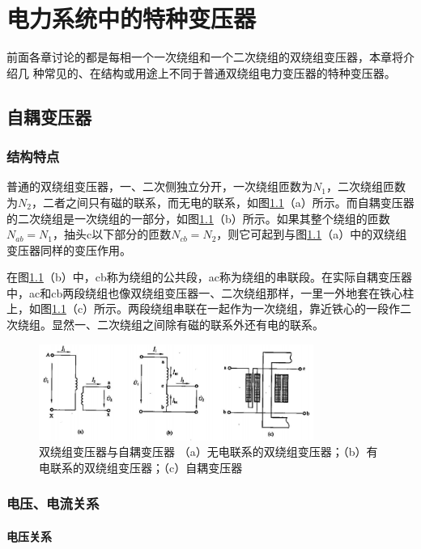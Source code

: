 \documentclass{book}
\begin{document}
\chapter{电力系统中的特种变压器}

前面各章讨论的都是每相一个一次绕组和一个二次绕组的双绕组变压器，本章将介绍几 种常见的、在结构或用途上不同于普通双绕组电力变压器的特种变压器。

\section{自耦变压器}

\subsection{结构特点}

普通的双绕组变压器，一、二次侧独立分开，一次绕组匝数为${{N}_{1}}$，二次绕组匝数为${{N}_{2}}$，二者之间只有磁的联系，而无电的联系，如图\ref{fig_5-1}（a）所示。而自耦变压器的二次绕组是一次绕组的一部分，如图\ref{fig_5-1}（b）所示。如果其整个绕组的匝数${{N}_{ab}}={{N}_{1}}$，抽头c以下部分的匝数${{N}_{cb}}={{N}_{2}}$，则它可起到与图\ref{fig_5-1}（a）中的双绕组变压器同样的变压作用。

在图\ref{fig_5-1}（b）中，cb称为绕组的公共段，ac称为绕组的串联段。在实际自耦变压器中，ac和cb两段绕组也像双绕组变压器一、二次绕组那样，一里一外地套在铁心柱上，如图\ref{fig_5-1}（c）所示。两段绕组串联在一起作为一次绕组，靠近铁心的一段作二次绕组。显然一、二次绕组之间除有磁的联系外还有电的联系。

\begin{figure}[H]
	\centering
	\includegraphics[width=0.80\textwidth]{5-1.png}
	\caption{双绕组变压器与自耦变压器
		（a）无电联系的双绕组变压器；（b）有电联系的双绕组变压器；（c）自耦变压器}
	\label{fig_5-1}
\end{figure}

\subsection{电压、电流关系}


\subsubsection{电压关系}
\end{document}
